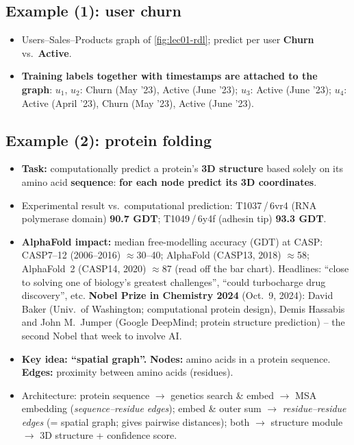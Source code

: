 \subsection{Example (1): user churn}\label{sec:lec01-churn}

\begin{itemize}
  \item Users--Sales--Products graph of \cref{fig:lec01-rdl}; predict per user
    \textbf{Churn} vs.\ \textbf{Active}.
  \item \textbf{Training labels together with timestamps are attached to the graph}:
    $u_1$, $u_2$: Churn (May '23), Active (June '23); $u_3$: Active (June '23); $u_4$:
    Active (April '23), Churn (May '23), Active (June '23).
\end{itemize}

\subsection{Example (2): protein folding}\label{sec:lec01-alphafold}

\begin{itemize}
  \item \textbf{Task:} computationally predict a protein's \textbf{3D structure} based solely
    on its amino acid \textbf{sequence}: \textbf{for each node predict its 3D coordinates}.
  \item Experimental result vs.\ computational prediction: T1037\,/\,6vr4 (RNA polymerase
    domain) \textbf{90.7 GDT}; T1049\,/\,6y4f (adhesin tip) \textbf{93.3 GDT}.
  \item \textbf{AlphaFold impact:} median free-modelling accuracy (GDT) at CASP: CASP7--12
    (2006--2016) $\approx$30--40; AlphaFold (CASP13, 2018) $\approx$58; AlphaFold~2 (CASP14,
    2020) $\approx$87 (read off the bar chart). Headlines: ``close to solving one of
    biology's greatest challenges'', ``could turbocharge drug discovery'', etc.
    \textbf{Nobel Prize in Chemistry 2024} (Oct.\ 9, 2024): David Baker (Univ.\ of
    Washington; computational protein design), Demis Hassabis and John M.\ Jumper (Google
    DeepMind; protein structure prediction) -- the second Nobel that week to involve AI.
  \item \textbf{Key idea: ``spatial graph''.} \textbf{Nodes:} amino acids in a protein
    sequence. \textbf{Edges:} proximity between amino acids (residues).
  \item Architecture: protein sequence $\to$ genetics search \& embed $\to$ MSA embedding
    (\emph{sequence--residue edges}); embed \& outer sum $\to$ \emph{residue--residue edges}
    (= spatial graph; gives pairwise distances); both $\to$ structure module $\to$ 3D
    structure + confidence score.
\end{itemize}

